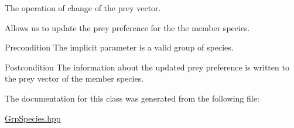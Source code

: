 The operation of change of the prey vector. 

Allows us to update the prey preference for the the member species.

\begin{DoxyPrecond}{Precondition}
The implicit parameter is a valid group of species. 
\end{DoxyPrecond}
\begin{DoxyPostcond}{Postcondition}
The information about the updated prey preference is written to the prey vector of the member species. 
\end{DoxyPostcond}


The documentation for this class was generated from the following file\-:\begin{DoxyCompactItemize}
\item 
\hyperlink{_grp_species_8hpp}{Grp\-Species.\-hpp}\end{DoxyCompactItemize}
